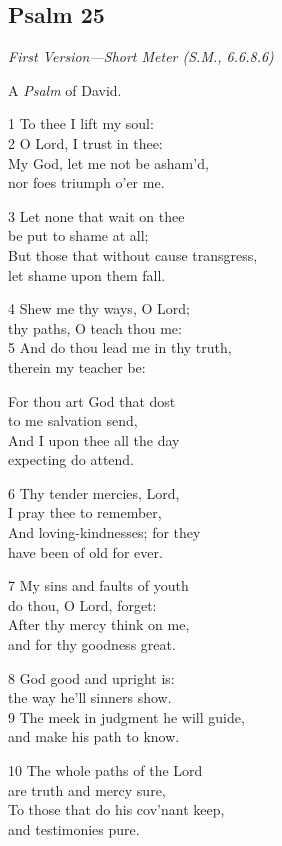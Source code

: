 \begin{multicols}{3}
\subsection*{Psalm 25 }

\emph{First Version---Short Meter (S.M., 6.6.8.6)}

A \emph{Psalm} of David.

1 To thee I lift my soul:\\
2 O Lord, I trust in thee:\\
My God, let me not be asham’d,\\
nor foes triumph o’er me.

3 Let none that wait on thee\\
be put to shame at all;\\
But those that without cause transgress,\\
let shame upon them fall.

4 Shew me thy ways, O Lord;\\
thy paths, O teach thou me:\\
5 And do thou lead me in thy truth,\\
therein my teacher be:

For thou art God that dost\\
to me salvation send,\\
And I upon thee all the day\\
expecting do attend.

6 Thy tender mercies, Lord,\\
I pray thee to remember,\\
And loving-kindnesses; for they\\
have been of old for ever.

7 My sins and faults of youth\\
do thou, O Lord, forget:\\
After thy mercy think on me,\\
and for thy goodness great.

8 God good and upright is:\\
the way he’ll sinners show.\\
9 The meek in judgment he will guide,\\
and make his path to know.

10 The whole paths of the Lord\\
are truth and mercy sure,\\
To those that do his cov’nant keep,\\
and testimonies pure.


\end{multicols}
